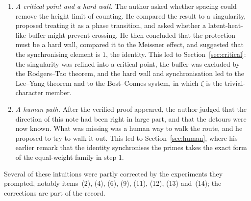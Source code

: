 \documentclass[11pt,a4paper]{article}
\theoremstyle{definition}\newtheorem{definition}[proposition]{Definition}
\theoremstyle{remark}\newtheorem{remark}[proposition]{Remark}
\begin{document}
\begin{enumerate}[label=(\arabic*),itemsep=1pt]
\item \emph{A critical point and a hard wall.} The author asked whether spacing could remove the height limit of counting. He compared the result to a singularity, proposed treating it as a phase transition, and asked whether a latent-heat-like buffer might prevent crossing. He then concluded that the protection must be a hard wall, compared it to the Meissner effect, and suggested that the synchronising element is $1$, the identity. This led to Section~\ref{sec:critical}: the singularity was refined into a critical point, the buffer was excluded by the Rodgers--Tao theorem, and the hard wall and synchronisation led to the Lee--Yang theorem and to the Bost--Connes system, in which $\zeta$ is the trivial-character member.
\item \emph{A human path.} After the verified proof appeared, the author judged that the direction of this note had been right in large part, and that the detours were now known. What was missing was a human way to walk the route, and he proposed to try to walk it out. This led to Section~\ref{sec:human}, where his earlier remark that the identity synchronises the primes takes the exact form of the equal-weight family in step 1.
\end{enumerate}
Several of these intuitions were partly corrected by the experiments they prompted, notably items~(2), (4), (6), (9), (11), (12), (13) and~(14); the corrections are part of the record.
\end{document}
